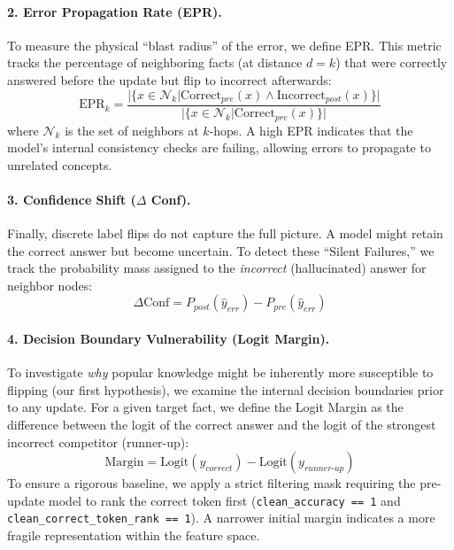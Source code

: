 \paragraph{2. Error Propagation Rate (EPR).}
To measure the physical ``blast radius'' of the error, we define EPR. This metric tracks the percentage of neighboring facts (at distance $d=k$) that were correctly answered before the update but flip to incorrect afterwards:
\begin{equation}
    \text{EPR}_k = \frac{|\{x \in \mathcal{N}_k | \text{Correct}_{pre}(x) \land \text{Incorrect}_{post}(x)\}|}{|\{x \in \mathcal{N}_k | \text{Correct}_{pre}(x)\}|}
\end{equation}
where $\mathcal{N}_k$ is the set of neighbors at $k$-hops. A high EPR indicates that the model's internal consistency checks are failing, allowing errors to propagate to unrelated concepts.

\paragraph{3. Confidence Shift ($\Delta$ Conf).}

Finally, discrete label flips do not capture the full picture. A model might retain the correct answer but become uncertain. To detect these ``Silent Failures,'' \cite{guo2017calibration} we track the probability mass assigned to the \textit{incorrect} (hallucinated) answer for neighbor nodes:
\begin{equation}
    \Delta \text{Conf} = P_{post}(\hat{y}_{err}) - P_{pre}(\hat{y}_{err})
\end{equation}

\paragraph{4. Decision Boundary Vulnerability (Logit Margin).}
To investigate \textit{why} popular knowledge might be inherently more susceptible to flipping (our first hypothesis), we examine the internal decision boundaries prior to any update. For a given target fact, we define the Logit Margin as the difference between the logit of the correct answer and the logit of the strongest incorrect competitor (runner-up):
\begin{equation}
    \text{Margin} = \text{Logit}(y_{correct}) - \text{Logit}(y_{runner\text{-}up})
\end{equation}
To ensure a rigorous baseline, we apply a strict filtering mask requiring the pre-update model to rank the correct token first (\texttt{clean\_accuracy == 1} and \texttt{clean\_correct\_token\_rank == 1}). A narrower initial margin indicates a more fragile representation within the feature space.

